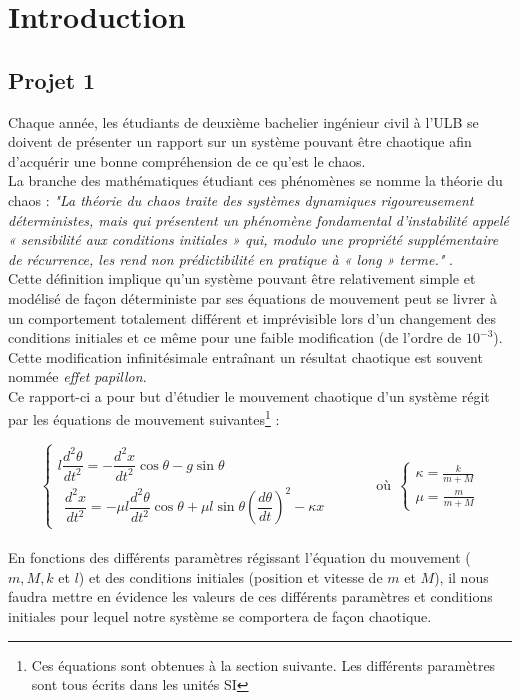\setcounter{section}{-1}
\section{Introduction}
\subsection{Projet 1}
Chaque année, les étudiants de deuxième bachelier ingénieur civil à l'ULB se doivent de 
présenter un rapport sur un système pouvant être chaotique afin d'acquérir une bonne 
compréhension de ce qu'est le chaos.\\

La branche des mathématiques étudiant ces phénomènes se nomme la théorie du chaos : 
\textit{"La théorie du chaos traite des systèmes dynamiques rigoureusement déterministes,
mais qui présentent un phénomène fondamental d'instabilité appelé « sensibilité aux conditions
initiales » qui, modulo une propriété supplémentaire de récurrence, les rend non prédictibilité
en pratique à « long » terme."} \cite{wiki}.\\

Cette définition implique qu'un système pouvant être relativement simple et modélisé de façon
déterministe par ses équations de mouvement peut se livrer à un comportement totalement différent
et imprévisible lors d'un changement des conditions initiales et ce même pour une faible
modification (de l'ordre de $10^{-3}$). Cette modification infinitésimale entraînant un résultat
chaotique est souvent nommée \textit{effet papillon}.\\

Ce rapport-ci a pour but d'étudier le mouvement chaotique d'un système régit par les équations de
mouvement suivantes\footnote{Ces équations sont obtenues à la section suivante. Les différents paramètres sont tous écrits dans les unités SI} \cite{projet1} :

\begin{equation}
\label{eq:a}
\left\{\begin{array}{l}
l\dfrac{d^2\theta}{dt^2} = -\dfrac{d^2x}{dt^2}\cos\theta - g\sin\theta\\
\ \ \dfrac{d^2x}{dt^2} = -\mu l\dfrac{d^2\theta}{dt^2}\cos\theta + \mu l\sin\theta\left(\dfrac{d\theta}{dt}\right)^2 - \kappa x
\end{array}\right.\ \ \ \ \ \ \ \ \ \ \ \ \ \ \ \text{où}\ \ \left\{\begin{array}{l}
\kappa = \frac{k}{m+M}\\
\mu = \frac{m}{m+M}
\end{array}\right.
\end{equation}\\
En fonctions des différents paramètres régissant l'équation du mouvement ($m, M, k$ et $l$) et
des conditions initiales (position et vitesse de $m$ et $M$), il nous faudra mettre en évidence
les valeurs de ces différents paramètres et conditions initiales pour lequel notre système se
comportera de façon chaotique.\\


